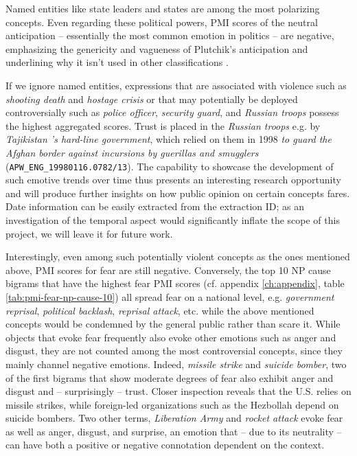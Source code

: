 Named entities like state leaders and states are among the most polarizing concepts. Even regarding these political powers, PMI scores of the neutral anticipation -- essentially the most common emotion in politics -- are negative, emphasizing the genericity and vagueness of Plutchik's anticipation and underlining why it isn't used in other classifications
\cite{ekman_basic_emotions}.

If we ignore named entities, expressions that are associated with violence such as \textit{shooting death} and \textit{hostage crisis} or that may potentially be deployed controversially such as \textit{police officer}, \textit{security guard}, and \textit{Russian troops} possess the highest aggregated scores. Trust is placed in the \textit{Russian troops} e.g. by \textit{Tajikistan 's hard-line government}, which relied on them in 1998 \textit{to guard the Afghan border against incursions by guerillas and smugglers} (\texttt{APW\_ENG\_19980116.0782/13}). The capability to showcase the development of such emotive trends over time thus presents an interesting research opportunity and will produce further insights on how public opinion on certain concepts fares. Date information can be easily extracted from the extraction ID; as an investigation of the temporal aspect would significantly inflate the scope of this project, we will leave it for future work.

Interestingly, even among such potentially violent concepts as the ones mentioned above, PMI scores for fear are still negative. Conversely, the top 10 NP cause bigrams that have the highest fear PMI scores (cf. appendix \ref{ch:appendix}, table \ref{tab:pmi-fear-np-cause-10}) all spread fear on a national level, e.g. \textit{government reprisal}, \textit{political backlash}, \textit{reprisal attack}, etc. while the above mentioned concepts would be condemned by the general public rather than scare it. While objects that evoke fear frequently also evoke other emotions such as anger and disgust, they are not counted among the most controversial concepts, since they mainly channel negative emotions. Indeed, \textit{missile strike} and \textit{suicide bomber}, two of the first bigrams that show moderate degrees of fear also exhibit anger and disgust and -- surprisingly -- trust. Closer inspection reveals that the U.S. relies on missile strikes, while foreign-led organizations such as the Hezbollah depend on suicide bombers. Two other terms, \textit{Liberation Army} and \textit{rocket attack} evoke fear as well as anger, disgust, and surprise, an emotion that -- due to its neutrality -- can have both a positive or negative connotation dependent on the context.

